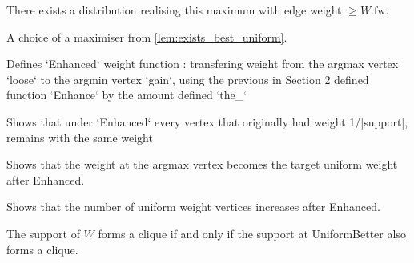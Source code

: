 \begin{lemma}
  \label{lem:exists_best_uniform}
  \leanok
  There exists a distribution realising this maximum with edge weight $\ge W.\mathrm{fw}$.
\end{lemma}

\begin{definition}[UniformBetter]
  \label{def:UniformBetter}
  \leanok
  A choice of a maximiser from \autoref{lem:exists_best_uniform}.
\end{definition}

\begin{definition}[Enhanced]
  \label{def:Enhanced}
  \leanok
  Defines `Enhanced` weight function : transfering weight from the argmax vertex `loose` to the argmin vertex `gain`, using the previous in Section 2 defined function `Enhance` by the amount defined `the_\varepsilon`
\end{definition}

\begin{lemma}
    \label{lem:Enhanced_unaffected}
    Shows that under `Enhanced` every vertex that originally had weight 1/|support|, remains with the same weight
\end{lemma}

\begin{lemma}
    \label{lem:Enhanced_effect_argmax}
    Shows that the weight at the argmax vertex becomes the target uniform weight after Enhanced.
\end{lemma}

\begin{lemma}
    \label{lem:Enhanced_inc_uniform_count}
    Shows that the number of uniform weight vertices increases after Enhanced.
\end{lemma}

\begin{lemma}
    \label{lem:UniformBetter_support_equiv}
    \leanok
    The support of $W$ forms a clique if and only if the support at UniformBetter also forms a clique.
\end{lemma}

